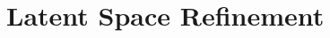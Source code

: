 %
%
%

\chapter{Latent Space Refinement}\label{chap:lsr}
\enlargethispage{2ex}
\vspace*{-2pt}

\enlargethispage{2ex}


%
